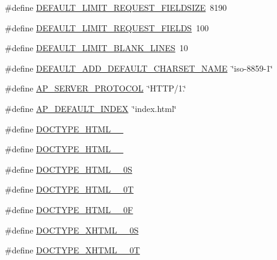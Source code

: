 \begin{DoxyCompactItemize}
\#define \hyperlink{group__APACHE__CORE__DAEMON_ga8891efcf92c7e9e13bbe541d694340d2}{D\+E\+F\+A\+U\+L\+T\+\_\+\+L\+I\+M\+I\+T\+\_\+\+R\+E\+Q\+U\+E\+S\+T\+\_\+\+F\+I\+E\+L\+D\+S\+I\+ZE}~8190
\item 
\#define \hyperlink{group__APACHE__CORE__DAEMON_ga19ecf472828b0092e2b5c4fb18b604d2}{D\+E\+F\+A\+U\+L\+T\+\_\+\+L\+I\+M\+I\+T\+\_\+\+R\+E\+Q\+U\+E\+S\+T\+\_\+\+F\+I\+E\+L\+DS}~100
\item 
\#define \hyperlink{group__APACHE__CORE__DAEMON_ga0b2e091c0d3f60a24caa44ec2cdb106e}{D\+E\+F\+A\+U\+L\+T\+\_\+\+L\+I\+M\+I\+T\+\_\+\+B\+L\+A\+N\+K\+\_\+\+L\+I\+N\+ES}~10
\item 
\#define \hyperlink{group__APACHE__CORE__DAEMON_gaf5ce507d0fcb36e6129cc2aec6cac122}{D\+E\+F\+A\+U\+L\+T\+\_\+\+A\+D\+D\+\_\+\+D\+E\+F\+A\+U\+L\+T\+\_\+\+C\+H\+A\+R\+S\+E\+T\+\_\+\+N\+A\+ME}~\char`\"{}iso-\/8859-\/1\char`\"{}
\item 
\#define \hyperlink{group__APACHE__CORE__DAEMON_ga7432aed9e5cf19107a870f71c5bde58a}{A\+P\+\_\+\+S\+E\+R\+V\+E\+R\+\_\+\+P\+R\+O\+T\+O\+C\+OL}~\char`\"{}H\+T\+TP/1.\char`\"{}
\item 
\#define \hyperlink{group__APACHE__CORE__DAEMON_gaa4384b5cab4ea8f7508656a8a65f6298}{A\+P\+\_\+\+D\+E\+F\+A\+U\+L\+T\+\_\+\+I\+N\+D\+EX}~\char`\"{}index.\+html\char`\"{}
\item 
\#define \hyperlink{group__APACHE__CORE__DAEMON_ga70618842d5ed94e721b9513714d994e7}{D\+O\+C\+T\+Y\+P\+E\+\_\+\+H\+T\+M\+L\+\_\+\_}
\item 
\#define \hyperlink{group__APACHE__CORE__DAEMON_ga979c3a0415bdbf6011e4ac998aab20d2}{D\+O\+C\+T\+Y\+P\+E\+\_\+\+H\+T\+M\+L\+\_\+\_}
\item 
\#define \hyperlink{group__APACHE__CORE__DAEMON_ga1de1c29435101cf2d912b20e2f247f84}{D\+O\+C\+T\+Y\+P\+E\+\_\+\+H\+T\+M\+L\+\_\+\_\+0S}
\item 
\#define \hyperlink{group__APACHE__CORE__DAEMON_ga774d5c6a0abb4bb9765b73644d7fa0ad}{D\+O\+C\+T\+Y\+P\+E\+\_\+\+H\+T\+M\+L\+\_\+\_\+0T}
\item 
\#define \hyperlink{group__APACHE__CORE__DAEMON_gabe311802e6b92d023b0e1ef8bdec62ee}{D\+O\+C\+T\+Y\+P\+E\+\_\+\+H\+T\+M\+L\+\_\+\_\+0F}
\item 
\#define \hyperlink{group__APACHE__CORE__DAEMON_ga1b747d3a2021b33a60218641dc85a9a3}{D\+O\+C\+T\+Y\+P\+E\+\_\+\+X\+H\+T\+M\+L\+\_\+\_\+0S}
\item 
\#define \hyperlink{group__APACHE__CORE__DAEMON_ga4b26e40deab9f18d2cbd36d163231430}{D\+O\+C\+T\+Y\+P\+E\+\_\+\+X\+H\+T\+M\+L\+\_\+\_\+0T}

\end{DoxyCompactItemize}

